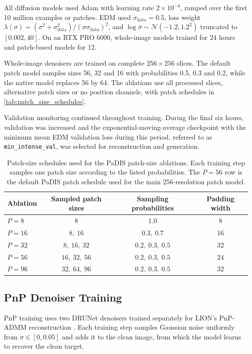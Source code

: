 All diffusion models used Adam \cite{kingma} with learning rate $2\times10^{-4}$, ramped over the first 10 million examples or patches. EDM used $\sigma_{\mathrm{data}}=0.5$, loss weight $\lambda(\sigma)=(\sigma^2+\sigma_{\mathrm{data}}^2)/(\sigma\sigma_{\mathrm{data}})^2$, and $\log\sigma\sim\mathcal{N}(-1.2,1.2^2)$ truncated to $[0.002,40]$. On an RTX PRO 6000, whole-image models trained for 24 hours and patch-based models for 12.

Whole-image denoisers are trained on complete $256\times256$ slices. The default patch model samples sizes 56, 32 and 16 with probabilities 0.5, 0.3 and 0.2, while the native model replaces 56 by 64. The ablations use all processed slices, alternative patch sizes or no position channels, with patch schedules in \autoref{tab:patch_size_schedules}.

Validation monitoring continued throughout training. During the final six hours, validation was increased and the exponential-moving-average checkpoint with the minimum mean EDM validation loss during this period, referred to as \texttt{min\_intense\_val}, was selected for reconstruction and generation.

\begin{table}[ht] 
    \centering 
    \begin{tabular}{lccc} 
        \hline 
        \textbf{Ablation} & \textbf{Sampled patch sizes} & \textbf{Sampling probabilities} & \textbf{Padding width} \\ 
        \hline 
        $P=8$ & $8$ & $1.0$ & $8$ \\ 
        $P=16$ & $8,\ 16$ & $0.3,\ 0.7$ & $16$ \\ 
        $P=32$ & $8,\ 16,\ 32$ & $0.2,\ 0.3,\ 0.5$ & $32$ \\ 
        $P=56$ & $16,\ 32,\ 56$ & $0.2,\ 0.3,\ 0.5$ & $24$ \\ 
        $P=96$ & $32,\ 64,\ 96$ & $0.2,\ 0.3,\ 0.5$ & $32$ \\ 
        \hline 
    \end{tabular} 
    \caption[PaDIS patch-size training schedules.]{Patch-size schedules used for the PaDIS patch-size ablations. Each training step samples one patch size according to the listed probabilities. The $P=56$ row is the default PaDIS patch schedule used for the main 256-resolution patch model.}
    \label{tab:patch_size_schedules}
\end{table}

\subsection{PnP Denoiser Training}
PnP training uses two DRUNet denoisers \cite{zhang_plug-and-play_2021} trained separately for LION's PnP-ADMM reconstruction \cite{chan_plug-and-play_2016}. Each training step samples Gaussian noise uniformly from $\sigma \in[0,0.05]$ and adds it to the clean image, from which the model learns to recover the clean target.

